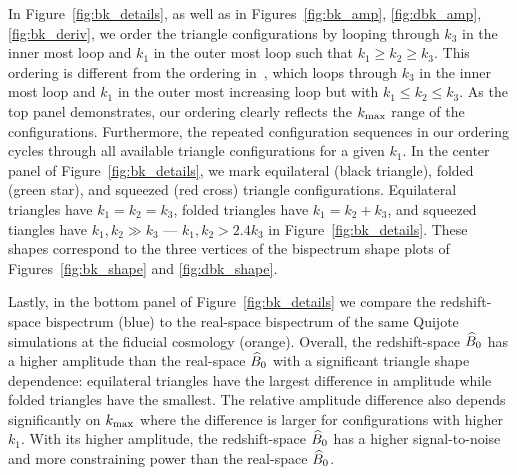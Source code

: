In Figure~\ref{fig:bk_details}, as well as in Figures~\ref{fig:bk_amp}, \ref{fig:dbk_amp}, 
\ref{fig:bk_deriv}, we order the triangle configurations by looping through 
$k_3$ in the inner most loop and $k_1$ in the outer most loop such that 
$k_1 \geq k_2 \geq k_3$. This ordering is different from the ordering in~\cite{gil-marin2017}, 
which loops through $k_3$ in the inner most loop and $k_1$ in the outer most 
increasing loop but with $k_1 \leq k_2 \leq k_3$. As the top panel demonstrates, 
our ordering clearly reflects the $k_{\rm max}$ range of the configurations. 
Furthermore, the repeated configuration sequences in our ordering cycles through
all available triangle configurations for a given $k_1$. In the center panel 
of Figure~\ref{fig:bk_details}, we mark equilateral (black triangle), folded 
(green star), and squeezed (red cross) triangle configurations. Equilateral 
triangles have $k_1 = k_2 = k_3$, folded triangles have $k_1 = k_2 + k_3$, and 
squeezed tiangles have $k_1, k_2 \gg k_3$ --- $k_1, k_2 > 2.4k_3$ in Figure~\ref{fig:bk_details}. 
These shapes correspond to the three vertices of the bispectrum shape plots of 
Figures~\ref{fig:bk_shape} and \ref{fig:dbk_shape}. 

Lastly, in the bottom panel of Figure~\ref{fig:bk_details} we compare the 
redshift-space bispectrum (blue) to the real-space bispectrum of the same 
Quijote simulations at the fiducial cosmology (orange). Overall, the 
redshift-space $\widehat{B}_0$ has a higher amplitude than the real-space $\widehat{B}_0$ with 
a significant triangle shape dependence: equilateral triangles have the 
largest difference in amplitude while folded triangles have the smallest. 
The relative amplitude difference also depends significantly on $k_{\rm max}$ 
where the difference is larger for configurations with higher $k_1$. With 
its higher amplitude, the redshift-space $\widehat{B}_0$ has a higher signal-to-noise 
and more constraining power than the real-space $\widehat{B}_0$.  
